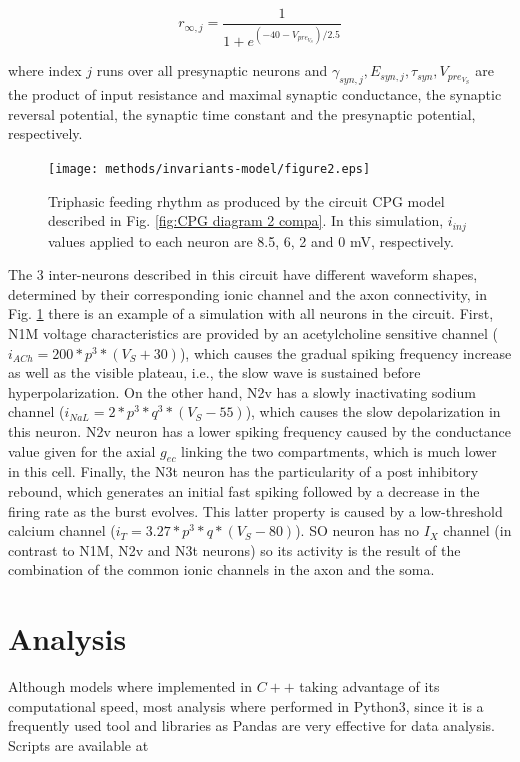\begin{equation}
	r_{\infty,j}=\frac{1}{1+e^{(-40-V_{pre_{V_S}})/2.5}}
	\label{eq:syn2}
\end{equation}


\noindent where index $j$ runs over all presynaptic neurons and \(\gamma_{syn,j}, E_{syn,j},\tau_{syn},V_{pre_{V_S}}\) are the product of input resistance and maximal synaptic conductance, the synaptic reversal potential, the synaptic time constant and the presynaptic potential, respectively. 


\begin{figure}[h!]
	\centering
	\texttt{[image: methods/invariants-model/figure2.eps]}
	\caption{Triphasic feeding rhythm as produced by the circuit CPG model described in Fig. \ref{fig:CPG diagram 2 compa}. In this simulation, $i_{inj}$ values applied to each neuron are 8.5, 6, 2 and 0 mV, respectively.}
	\label{fig:model simulation}
\end{figure}

The 3 inter-neurons described in this circuit have different waveform shapes, determined by their corresponding ionic channel and the axon connectivity, in Fig. \ref{fig:model simulation}   there is an example of a simulation with all neurons in the circuit. First, N1M voltage characteristics are provided by an acetylcholine sensitive channel (\(i_{ACh} = 200 * p^3 * (V_S + 30)\)), which causes the gradual spiking frequency increase as well as the visible plateau, i.e., the slow wave is sustained before hyperpolarization. On the other hand, N2v has a slowly inactivating sodium channel (\(i_{NaL} = 2 * p^3 * q^3 * (V_S-55)\)), which causes the slow depolarization in this neuron. N2v neuron has a lower spiking frequency caused by the conductance value given for the axial $g_{ec}$ linking the two compartments, which is much lower in this cell. Finally, the N3t neuron has the particularity of a post inhibitory rebound, which generates an initial fast spiking followed by a decrease in the firing rate as the burst evolves. This latter property is caused by a low-threshold calcium channel (\( i_T = 3.27 * p^3 * q *(V_S-80)\)). SO neuron has no \(I_X\) channel (in contrast to N1M, N2v and N3t neurons) so its activity is the result of the combination of the common ionic channels in the axon and the soma.

 
\section{Analysis}
Although models where implemented in $C++$ taking advantage of its computational speed, most analysis where performed in Python3, since it is a frequently used tool and libraries as Pandas are very effective for data analysis. 
Scripts are available at 

